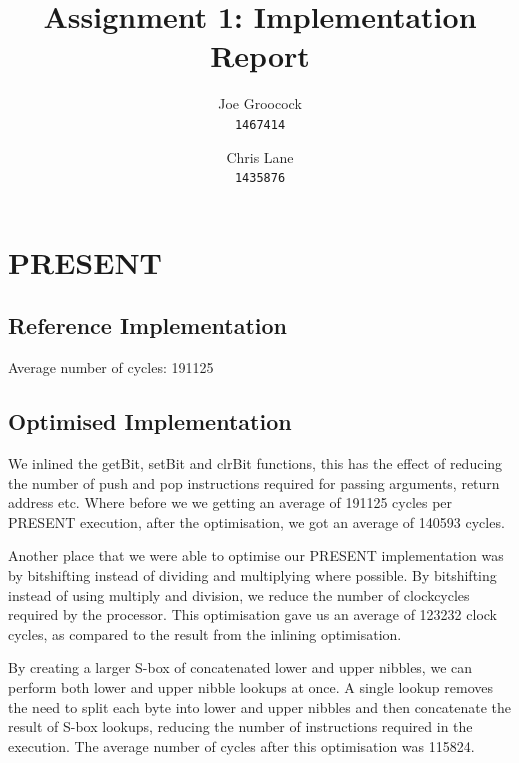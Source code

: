 \documentclass[11pt, a4paper]{article}
\title{Assignment 1: Implementation Report}
\author{Joe Groocock    \\ \texttt{\normalsize 1467414}
    \and Chris Lane     \\ \texttt{\normalsize 1435876}
}
\begin{document}
\maketitle

\section{PRESENT}\label{sec:present}
\subsection{Reference Implementation}\label{subsec:referenceImplementation}
Average number of cycles: 191125

\subsection{Optimised Implementation}\label{subsec:optimisedImplementation}


We inlined the getBit, setBit and clrBit functions, this has the effect of reducing the number of push and pop instructions required for passing arguments, return address etc.
Where before we we getting an average of 191125 cycles per PRESENT execution, after the optimisation, we got an average of 140593 cycles.

Another place that we were able to optimise our PRESENT implementation was by bitshifting instead of dividing and multiplying where possible. By bitshifting instead of using multiply and division, we reduce the number of clockcycles required by the processor.
This optimisation gave us an average of 123232 clock cycles, as compared to the result from the inlining optimisation.

By creating a larger S-box of concatenated lower and upper nibbles, we can perform both lower and upper nibble lookups at once. A single lookup removes the need to split each byte into lower and upper nibbles and then concatenate the result of S-box lookups, reducing the number of instructions required in the execution.
The average number of cycles after this optimisation was 115824.
\end{document}
